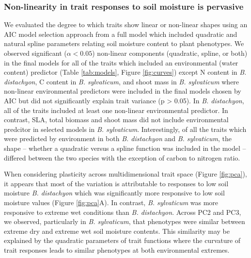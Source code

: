 \documentclass[jou,floatsintext]{apa6}
\begin{document}
\hypertarget{non-linearity-in-trait-responses-to-soil-moisture-is-pervasive}{%
\subsubsection{Non-linearity in trait responses to soil moisture is pervasive}\label{non-linearity-in-trait-responses-to-soil-moisture-is-pervasive}}

We evaluated the degree to which traits show linear or non-linear shapes using an AIC model selection approach from a full model which included quadratic and natural spline parameters relating soil moisture content to plant phenotypes. We observed significant (\(\alpha < 0.05\)) non-linear components (quadratic, spline, or both) in the final models for all of the traits which included an environmental (water content) predictor (Table \ref{tab:models}, Figure \ref{fig:curves}) except N content in \emph{B. distachyon}, C content in \emph{B. sylvaticum}, and shoot mass in \emph{B. sylvaticum} where non-linear environmental predictors were included in the final models chosen by AIC but did not significantly explain trait variance (p \textgreater{} 0.05). In \emph{B. distachyon}, all of the traits included at least one non-linear environmental predictor. In contrast, SLA, total biomass and shoot mass did not include environmental predcitor in selected models in \emph{B. sylvaticum}. Interestingly, of all the traits which were predicted by environment in both \emph{B. distachyon} and \emph{B. sylvaticum}, the shape -- whether a quadratic versus a spline function was included in the model -- differed between the two species with the exception of carbon to nitrogen ratio.

When considering plasticity across multidimensional trait space (Figure \ref{fig:pca}), it appears that most of the variation is attributable to responses to low soil moisture \emph{B. distachyon} which was significantly more responsive to low soil moisture values (Figure \ref{fig:pca}A). In contrast, \emph{B. sylvaticum} was more responsive to extreme wet conditions than \emph{B. distachyon}. Across PC2 and PC3, we observed, particularly in \emph{B. sylvaticum}, that phenotypes were similar between extreme dry and extreme wet soil moisture contents. This similarity may be explained by the quadratic parameters of trait functions where the curvature of trait responses leads to similar phenotypes at both environmental extremes.
\end{document}
